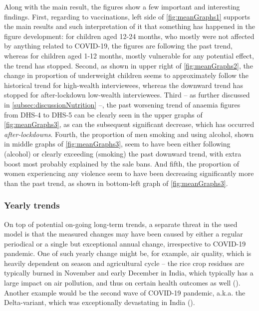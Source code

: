 \documentclass[12pt,a4paper,notitlepage]{article}
\begin{document}
Along with the main result, the figures show a few important and interesting findings. First, regarding to vaccinations, left side of \cref{fig:meanGraphs1} supports the main results and such interpretation of it that something has happened in the figure development: for children aged 12-24 months, who mostly were not affected by anything related to COVID-19, the figures are following the past trend, whereas for children aged 1-12 months, mostly vulnerable for any potential effect, the trend has stopped. Second, as shown in upper right of \cref{fig:meanGraphs2}, the change in proportion of underweight children seems to approximately follow the historical trend for high-wealth interviewees, whereas the downward trend has stopped for after-lockdown low-wealth interviewees. Third -- as further discussed in \cref{subsec:discussionNutrition} --, the past worsening trend of anaemia figures from DHS-4 to DHS-5 can be clearly seen in the upper graphs of \cref{fig:meanGraphs3}, as can the subsequent significant decrease, which has occurred \textit{after-lockdowns}. Fourth, the proportion of men smoking and using alcohol, shown in middle graphs of \cref{fig:meanGraphs3}, seem to have been either following (alcohol) or clearly exceeding (smoking) the past downward trend, with extra boost most probably explained by the sale bans. And fifth, the proportion of women experiencing any violence seem to have been decreasing significantly more than the past trend, as shown in bottom-left graph of \cref{fig:meanGraphs3}.

\subsubsection{Yearly trends} \label{subsubsec:yearlyTrends}

On top of potential on-going long-term trends, a separate threat in the used model is that the measured changes may have been caused by either a regular periodical or a single but exceptional annual change, irrespective to COVID-19 pandemic. One of such yearly change might be, for example, air quality, which is heavily dependent on season and agricultural cycle -- the rice crop residues are typically burned in November and early December in India, which typically has a large impact on air pollution, and thus on certain health outcomes as well (\citet{McDonald:2020}). Another example would be the second wave of COVID-19 pandemic, a.k.a. the Delta-variant, which was exceptionally devastating in India (\citet{Salvatore:2022}).
\end{document}
